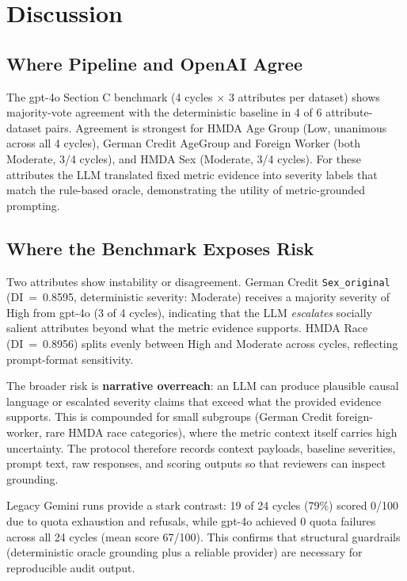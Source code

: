 \documentclass[11pt,a4paper]{article}
\begin{document}
\section{Discussion}

\subsection{Where Pipeline and OpenAI Agree}

The gpt-4o Section C benchmark (4 cycles $\times$ 3 attributes per dataset)
shows majority-vote agreement with the deterministic baseline in 4 of 6
attribute-dataset pairs. Agreement is strongest for HMDA Age Group (Low,
unanimous across all 4 cycles), German Credit AgeGroup and Foreign Worker
(both Moderate, 3/4 cycles), and HMDA Sex (Moderate, 3/4 cycles). For these
attributes the LLM translated fixed metric evidence into severity labels that
match the rule-based oracle, demonstrating the utility of metric-grounded
prompting.

\subsection{Where the Benchmark Exposes Risk}

Two attributes show instability or disagreement. German Credit
\texttt{Sex\_original} (DI~=~0.8595, deterministic severity: Moderate)
receives a majority severity of High from gpt-4o (3 of 4 cycles), indicating
that the LLM \emph{escalates} socially salient attributes beyond what the
metric evidence supports. HMDA Race (DI~=~0.8956) splits evenly between High
and Moderate across cycles, reflecting prompt-format sensitivity.

The broader risk is \textbf{narrative overreach}: an LLM can produce
plausible causal language or escalated severity claims that exceed what the
provided evidence supports. This is compounded for small subgroups (German
Credit foreign-worker, rare HMDA race categories), where the metric context
itself carries high uncertainty. The protocol therefore records context
payloads, baseline severities, prompt text, raw responses, and scoring
outputs so that reviewers can inspect grounding.

Legacy Gemini runs provide a stark contrast: 19 of 24 cycles (79\%) scored
0/100 due to quota exhaustion and refusals, while gpt-4o achieved 0
quota failures across all 24 cycles (mean score 67/100). This confirms that
structural guardrails (deterministic oracle grounding plus a reliable
provider) are necessary for reproducible audit output.
\end{document}
